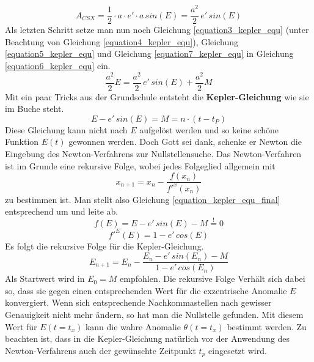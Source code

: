 \begin{equation}
	A_{CSX}=\frac{1}{2}\cdot a\cdot e' \cdot a\,sin(E)=\frac{a^2}{2}\,e'\,sin(E)
	\label{equation7_kepler_equ}
\end{equation}
Als letzten Schritt setze man nun noch Gleichung \ref{equation3_kepler_equ} (unter Beachtung von Gleichung \ref{equation4_kepler_equ}), Gleichung \ref{equation5_kepler_equ} und Gleichung \ref{equation7_kepler_equ} in Gleichung \ref{equation6_kepler_equ} ein.
\begin{equation}
	\frac{a^2}{2}E=\frac{a^2}{2}\,e'\,sin(E)+\frac{a^2}{2}M
	\label{equation8_kepler_equ}
\end{equation}
Mit ein paar Tricks aus der Grundschule entsteht die \textbf{Kepler-Gleichung} wie sie im Buche steht.
\begin{equation}
	E-e'\,sin(E)=M=n\cdot (t-t_P)
	\label{equation_kepler_equ_final}
\end{equation}
Diese Gleichung kann nicht nach \ensuremath{E} aufgelöst werden und so keine schöne Funktion \ensuremath{E(t)} gewonnen werden. Doch Gott sei dank, schenke er Newton die Eingebung des Newton-Verfahrens zur Nullstellensuche. Das Newton-Verfahren ist im Grunde eine rekursive Folge, wobei jedes Folgeglied allgemein mit
\begin{equation}
	x_{n+1}=x_n-\frac{f(x_n)}{f'^{x}(x_n)}
	\label{equation9_kepler_equ}
\end{equation}
zu bestimmen ist. Man stellt also Gleichung \ref{equation_kepler_equ_final} entsprechend um und leite ab.
\begin{equation}
	f(E)=E-e'\,sin(E)-M \stackrel{!}{=} 0
	\label{equation10_kepler_equ}
\end{equation}
\begin{equation}
	f'^{E}(E)=1-e'\,cos(E) 
	\label{equation11_kepler_equ}
\end{equation}
Es folgt die rekursive Folge für die Kepler-Gleichung. 
\begin{equation}
	E_{n+1}=E_n-\frac{E_n-e'\,sin(E_n)-M}{1-e'\,cos(E_n) }
	\label{equation12_kepler_equ}
\end{equation}
Als Startwert wird in \cite{HandRaum} \ensuremath{E_0=M} empfohlen. Die rekursive Folge Verhält sich dabei so, dass sie gegen einen entsprechenden Wert für die exzentrische Anomalie \ensuremath{E} konvergiert. Wenn sich entsprechende Nachkommastellen nach gewisser Genauigkeit nicht mehr ändern, so hat man die Nullstelle gefunden. Mit diesem Wert für \ensuremath{E(t=t_x)} kann die wahre Anomalie \ensuremath{\theta(t=t_x)} bestimmt werden. Zu beachten ist, dass in die Kepler-Gleichung natürlich vor der Anwendung des Newton-Verfahrens auch der gewünschte Zeitpunkt \ensuremath{t_p} eingesetzt wird.     
